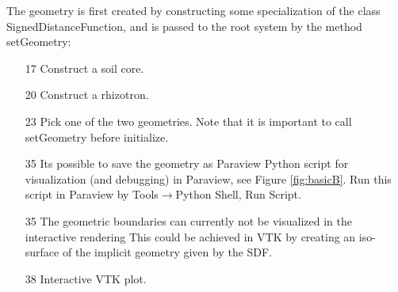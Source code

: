 

The geometry is first created by constructing some specialization of the class SignedDistanceFunction, 
and is passed to the root system by the method setGeometry: 
\begin{itemize}
 \item[17] Construct a soil core. 
 \item[20] Construct a rhizotron.
 \item[23] Pick one of the two geometries. Note that it is important to call setGeometry before initialize.
 \item[35] Its possible to save the geometry as Paraview Python script for visualization (and debugging) in Paraview, 
 see Figure \ref{fig:basicB}. Run this script in Paraview by Tools$\rightarrow$Python Shell, Run Script.
\item[35] The geometric boundaries can currently not be visualized in the interactive rendering 
This could be achieved in VTK by creating an iso-surface of the implicit geometry given by the SDF.
\item[38] Interactive VTK plot. 
\end{itemize}

